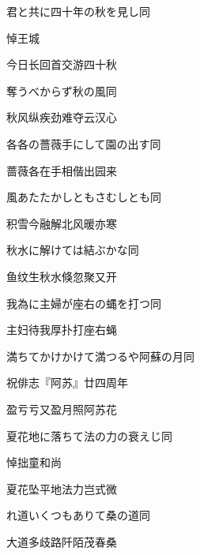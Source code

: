 \begin{haiku}
    {\FH 君と共に四十年の秋を見し}\hfill{\FH 同}

    {\FK 悼王城}

    {\FK 今日长回首交游四十秋}
\end{haiku}

\begin{haiku}
    {\FH {}奪うべからず秋の風}\hfill{\FH 同}

    {\FK 秋风纵疾劲难夺云汉心}
\end{haiku}

\begin{haiku}
    {\FH 各各の薔薇手にして園の出す}\hfill{\FH 同}

    {\FK 蔷薇各在手相偕出园来}
\end{haiku}

\begin{haiku}
    {\FH {}風あたたかしともさむしとも}\hfill{\FH 同}

    {\FK 积雪今融解北风暖亦寒}
\end{haiku}

\begin{haiku}
    {\FH 秋水に解けては結ぶかな}\hfill{\FH 同}

    {\FK 鱼纹生秋水倏忽聚又开}
\end{haiku}

\begin{haiku}
    {\FH 我為に主婦が座右の蝿を打つ}\hfill{\FH 同}

    {\FK 主妇待我厚扑打座右蝇}
\end{haiku}

\begin{haiku}
    {\FH 満ちてかけかけて満つるや阿蘇の月}\hfill{\FH 同}

    {\FK 祝俳志『阿苏』廿四周年}

    {\FK 盈亏亏又盈月照阿苏花}
\end{haiku}

\begin{haiku}
    {\FH 夏花地に落ちて法の力の衰えじ}\hfill{\FH 同}

    {\FK 悼拙童和尚}

    {\FK 夏花坠平地法力岂式微}
\end{haiku}

\begin{haiku}
    {\FH {}れ道いくつもありて桑の道}\hfill{\FH 同}

    {\FK 大道多歧路阡陌茂春桑}
\end{haiku}

